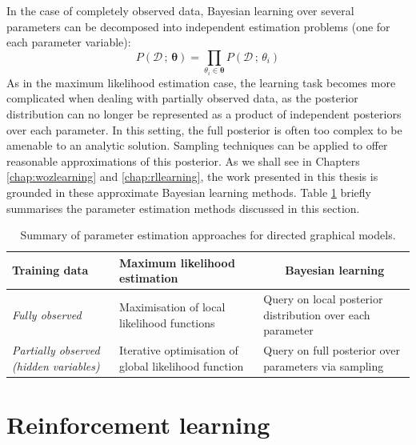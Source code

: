 In the case of completely observed data, Bayesian learning over several parameters can be decomposed into independent estimation problems (one for each parameter variable): 
\begin{equation}
P(\mathcal{D} \, ; \, \boldsymbol\theta) = \prod_{\theta_i \in \boldsymbol\theta} P(\mathcal{D} \, ; \, \theta_i)
\end{equation}
As in the maximum likelihood estimation case, the learning task becomes more complicated when dealing with partially observed data, as the posterior distribution can no longer be represented as a product of independent posteriors over each parameter.  In this setting, the full posterior is often too complex to be amenable to an analytic solution.  Sampling techniques can be applied to offer reasonable approximations of this posterior.  As we shall see in Chapters \ref{chap:wozlearning} and \ref{chap:rllearning}, the work presented in this thesis is grounded in these approximate Bayesian learning methods. Table \ref{table:gmlearning} briefly summarises the parameter estimation methods discussed in this section.

\begin{table}[h]
\renewcommand{\arraystretch}{1.8}
\setlength{\tabcolsep}{10pt}
\vspace{3mm}
\begin{center}
\begin{tabular}{|p{30mm}||p{42mm}|p{48mm}|} \hline 
\centering \textbf{Training data} & \centering \textbf{Maximum likelihood estimation} &  $\ \ \ \ \ \ \ $ \textbf{Bayesian learning} \\ \hline
\textit{Fully observed} & Maximisation of local $\phantom{aa}$ likelihood functions & Query on local posterior distribution over each parameter \\
\textit{Partially observed (hidden variables)} &  Iterative optimisation of global likelihood function &  Query on full posterior over parameters via sampling \vspace{2mm} \\  \hline
\end{tabular}
\end{center}
\caption{Summary of parameter estimation approaches for directed graphical models.}
\label{table:gmlearning}
\end{table}


\section{Reinforcement learning}
\label{sec:rl}

